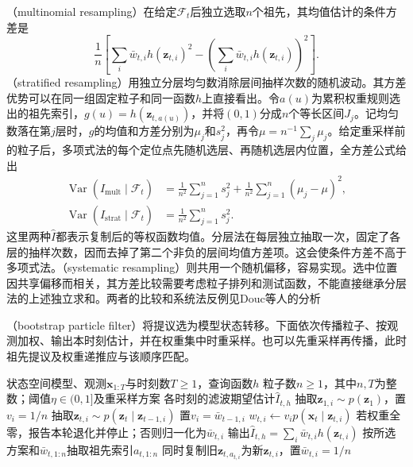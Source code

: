 （multinomial resampling）在给定$\mathcal{F}_t$后独立选取$n$个祖先，其均值估计的条件方差是
\begin{equation}
  \frac1n\left[
    \sum_i\bar w_{t,i}h(\bm{z}_{t,i})^2
      -\left(\sum_i\bar w_{t,i}h(\bm{z}_{t,i})\right)^2
  \right].
  \label{eq:pgm-sampling-resampling-variance}
\end{equation}
（stratified resampling）用独立分层均匀数消除层间抽样次数的随机波动。其方差优势可以在同一组固定粒子和同一函数$h$上直接看出。令$a(u)$为累积权重规则选出的祖先索引，$g(u)=h(\bm z_{t,a(u)})$，并将$(0,1)$分成$n$个等长区间$J_j$。记均匀数落在第$j$层时，$g$的均值和方差分别为$\mu_j$和$s_j^2$，再令$\mu=n^{-1}\sum_j\mu_j$。给定重采样前的粒子后，多项式法的每个定位点先随机选层、再随机选层内位置，全方差公式给出
\[
  \begin{aligned}
    \operatorname{Var}(\widehat I_{\mathrm{mult}}\mid\mathcal F_t)
      &=\frac{1}{n^2}\sum_{j=1}^n s_j^2
          +\frac{1}{n^2}\sum_{j=1}^n(\mu_j-\mu)^2,\\
    \operatorname{Var}(\widehat I_{\mathrm{strat}}\mid\mathcal F_t)
      &=\frac{1}{n^2}\sum_{j=1}^n s_j^2.
  \end{aligned}
\]
这里两种$\widehat I$都表示复制后的等权函数均值。分层法在每层独立抽取一次，固定了各层的抽样次数，因而去掉了第二个非负的层间均值方差项。这会使条件方差不高于多项式法。（systematic resampling）则共用一个随机偏移，容易实现。选中位置因共享偏移而相关，其方差比较需要考虑粒子排列和测试函数，不能直接继承分层法的上述独立求和。两者的比较和系统法反例见Douc等人的分析

（bootstrap particle filter）将提议选为模型状态转移。下面依次传播粒子、按观测加权、输出本时刻估计，并在权重集中时重采样。也可以先重采样再传播，此时祖先提议及权重递推应与该顺序匹配。

\begin{algorithm}[带阈值重采样的自举粒子滤波]
  \label{alg:pgm-sampling-bootstrap}
  \begin{algorithmic}[1]
    \Require 状态空间模型、观测$\bm{x}_{1:T}$与时刻数$T\geq1$，查询函数$h$
    \Require 粒子数$n\geq1$，其中$n,T$为整数；阈值$\eta\in(0,1]$及重采样方案
    \Ensure 各时刻的滤波期望估计$\widehat I_{t,h}$
          \State 抽取$\bm{z}_{1,i}\sim p(\bm{z}_1)$，置$v_i=1/n$
        \Else
          \State 抽取$\bm{z}_{t,i}\sim p(\bm{z}_t\mid\bm{z}_{t-1,i})$
          \State 置$v_i=\bar w_{t-1,i}$
        \EndIf
        \State $w_{t,i}\gets v_i p(\bm{x}_t\mid\bm{z}_{t,i})$
      \EndFor
      \State 若权重全零，报告本轮退化并停止；否则归一化为$\bar w_{t,i}$
      \State 输出$\widehat I_{t,h}=\sum_i\bar w_{t,i}h(\bm{z}_{t,i})$
        \State 按所选方案和$\bar w_{t,1:n}$抽取祖先索引$a_{t,1:n}$
        \State 同时复制旧$\bm{z}_{t,a_{t,i}}$为新$\bm{z}_{t,i}$，置$\bar w_{t,i}=1/n$
      \EndIf
    \EndFor
  \end{algorithmic}
\end{algorithm}

